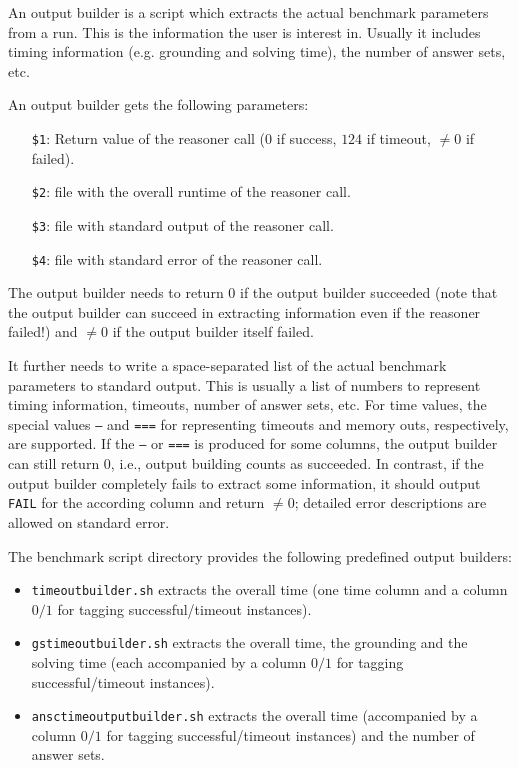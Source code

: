 \documentclass[a4paper]{article}
\begin{document}
		An output builder is a script which extracts the actual benchmark parameters
		from a run. This is the information the user is interest in. Usually it
		includes timing information (e.g. grounding and solving time), the number of answer sets, etc.
		
		An output builder gets the following parameters:
		    \begin{itemize}
				\item[{\tt \$1}:] Return value of the reasoner call ($0$ if success, $124$ if timeout, $\not= 0$ if failed).
				\item[{\tt \$2}:] file with the overall runtime of the reasoner call.
				\item[{\tt \$3}:] file with standard output of the reasoner call.
				\item[{\tt \$4}:] file with standard error of the reasoner call.
		    \end{itemize}
		
		The output builder needs to return $0$ if the output builder succeeded (note that the output builder can succeed in extracting information even if the reasoner failed!)
		and $\not=0$ if the output builder itself failed.
		
		It further needs to write a space-separated list of the actual benchmark parameters to standard output.
		This is usually a list of numbers to represent timing information, timeouts, number of answer sets, etc. For time values,
		the special values {\tt ---} and {\tt ===} for representing timeouts and memory outs, respectively, are supported.
		If the {\tt ---} or {\tt ===} is produced for some columns, the output builder can still return $0$, i.e.,
		output building counts as succeeded.
		In contrast, if the output builder completely fails to extract some information, it should output {\tt FAIL} for the according column
		and return $\not=0$; detailed error descriptions are allowed on standard error.
		
		The benchmark script directory provides the following predefined output builders:
				
		\begin{itemize}
		    \item {\tt timeoutbuilder.sh} extracts the overall time (one time column and a column $0/1$ for tagging successful/timeout instances).
		    \item {\tt gstimeoutbuilder.sh} extracts the overall time, the grounding and the solving time (each accompanied by a column $0/1$ for tagging successful/timeout instances).
		    \item {\tt ansctimeoutputbuilder.sh} extracts the overall time (accompanied by a column $0/1$ for tagging successful/timeout instances) and the number of answer sets.
		\end{itemize}
			
\end{document}
